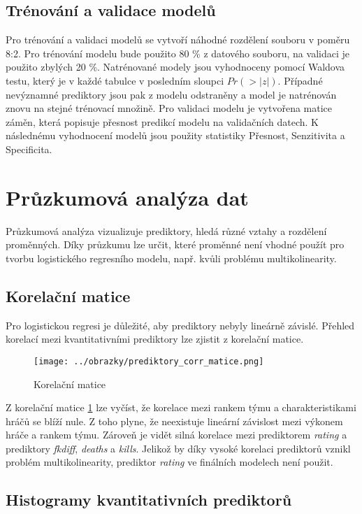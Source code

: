 \subsection{Trénování a validace modelů}
Pro trénování a validaci modelů se vytvoří náhodné rozdělení souboru v poměru 8:2. Pro trénování modelu bude použito 80 \% z datového souboru, na validaci je použito zbylých 20 \%.
Natrénované modely jsou vyhodnoceny pomocí Waldova testu, který je v každé tabulce v posledním sloupci $Pr(>|z|)$. Případné nevýznamné prediktory jsou pak z modelu
odstraněny a model je natrénován znovu na stejné trénovací množině. Pro validaci modelu je vytvořena matice záměn, která popisuje přesnost predikcí modelu na validačních
datech. K následnému vyhodnocení modelů jsou použity statistiky Přesnost, Senzitivita a Specificita. 

\newpage
\section{Průzkumová analýza dat}
Průzkumová analýza vizualizuje prediktory, hledá různé vztahy a rozdělení proměnných. Díky průzkumu lze určit, které proměnné není vhodné použít pro tvorbu
logistického regresního modelu, např. kvůli problému multikolinearity.

\subsection{Korelační matice}
Pro logistickou regresi je důležité, aby prediktory nebyly lineárně závislé. Přehled korelací mezi kvantitativními prediktory lze zjistit z korelační matice.

\begin{figure}[H]
    \centering
    \texttt{[image: ../obrazky/prediktory\_corr\_matice.png]}
    \caption{Korelační matice} 
    \label{fig:korelacni_matice}
\end{figure}

Z korelační matice \ref{fig:korelacni_matice} lze vyčíst, že korelace mezi rankem týmu a charakteristikami hráčů se blíží nule. Z toho plyne, že neexistuje lineární závislost mezi
výkonem hráče a rankem týmu. Zároveň je vidět silná korelace mezi prediktorem \textit{rating} a prediktory \textit{fkdiff}, \textit{deaths} a \textit{kills}.
Jelikož by díky vysoké korelaci prediktorů vznikl problém multikolinearity, prediktor \textit{rating} ve finálních modelech není použit.

\subsection{Histogramy kvantitativních prediktorů}

